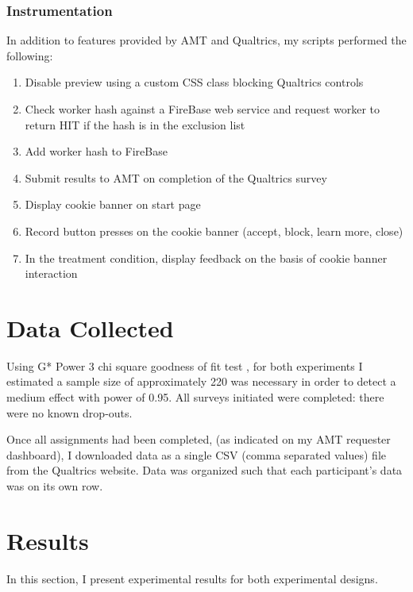 \subsubsection{Instrumentation}
\label{instrumentation}

In addition to features provided by AMT and Qualtrics, my scripts performed the following:


\begin{sloppier}
\begin{enumerate}
\item Disable preview using a custom CSS class blocking Qualtrics controls
\item Check worker hash against a FireBase web service and request worker to return HIT if the hash is in the exclusion list
\item Add worker hash to FireBase
\item Submit results to AMT on completion of the Qualtrics survey
\item Display cookie banner on start page
\item Record button presses on the cookie banner (accept, block, learn more, close)
\item In the treatment condition, display feedback on the basis of cookie banner interaction
\end{enumerate}
\end{sloppier}


\section{Data Collected}
\label{datacollected}

Using G* Power 3 chi square goodness of fit test  \citep{PowerAnalysisIntro:2012uy},  for both experiments I estimated a sample size of approximately 220 was necessary in order to detect a medium effect with power of 0.95. All surveys initiated were completed: there were no known drop-outs.

Once all assignments had been completed, (as indicated on my AMT requester dashboard), I downloaded data as a single CSV (comma separated values) file from the Qualtrics website. Data was organized such that each participant's data was on its own row.

\section{Results}
\label{results}

In this section, I present experimental results for both experimental designs.

